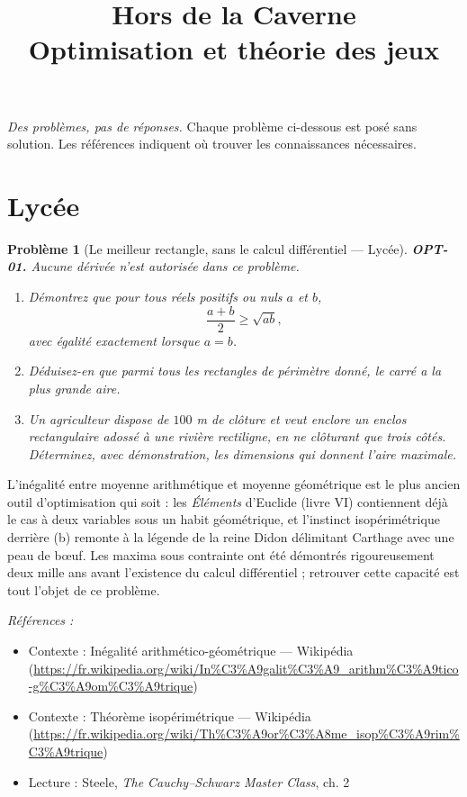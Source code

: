 \documentclass[11pt]{article}
\title{Hors de la Caverne \\ \Large Optimisation et théorie des jeux}
\author{}
\date{}
\newtheorem{problem}{Problème}
\newenvironment{refs}{\par\small\noindent\emph{Références :}\begin{itemize}\setlength\itemsep{0pt}}{\end{itemize}\normalsize}
\begin{document}
\maketitle
\noindent\emph{Des problèmes, pas de réponses.} Chaque problème ci-dessous est posé
sans solution. Les références indiquent où trouver les connaissances nécessaires.
\medskip


\section*{Lycée}

\begin{problem}[{Le meilleur rectangle, sans le calcul différentiel --- Lycée}]
\textbf{OPT-01.} Aucune dérivée n'est autorisée dans ce problème.
\begin{enumerate}
\item[(a)] Démontrez que pour tous réels positifs ou nuls $a$ et $b$,
\[ \frac{a+b}{2} \ge \sqrt{ab}, \]
avec égalité exactement lorsque $a = b$.
\item[(b)] Déduisez-en que parmi tous les rectangles de périmètre donné, le carré a la plus grande aire.
\item[(c)] Un agriculteur dispose de $100$ m de clôture et veut enclore un enclos rectangulaire adossé à une rivière rectiligne, en ne clôturant que trois côtés. Déterminez, avec démonstration, les dimensions qui donnent l'aire maximale.
\end{enumerate}

\end{problem}

\noindent L'inégalité entre moyenne arithmétique et moyenne géométrique est le plus ancien outil d'optimisation qui soit : les \textit{Éléments} d'Euclide (livre VI) contiennent déjà le cas à deux variables sous un habit géométrique, et l'instinct isopérimétrique derrière (b) remonte à la légende de la reine Didon délimitant Carthage avec une peau de b\oe{}uf. Les maxima sous contrainte ont été démontrés rigoureusement deux mille ans avant l'existence du calcul différentiel ; retrouver cette capacité est tout l'objet de ce problème.

\begin{refs}
\item Contexte : Inégalité arithmético-géométrique --- Wikipédia (\url{https://fr.wikipedia.org/wiki/In%C3%A9galit%C3%A9_arithm%C3%A9tico-g%C3%A9om%C3%A9trique})
\item Contexte : Théorème isopérimétrique --- Wikipédia (\url{https://fr.wikipedia.org/wiki/Th%C3%A9or%C3%A8me_isop%C3%A9rim%C3%A9trique})
\item Lecture : Steele, \textit{The Cauchy--Schwarz Master Class}, ch. 2
\end{refs}
\end{document}
